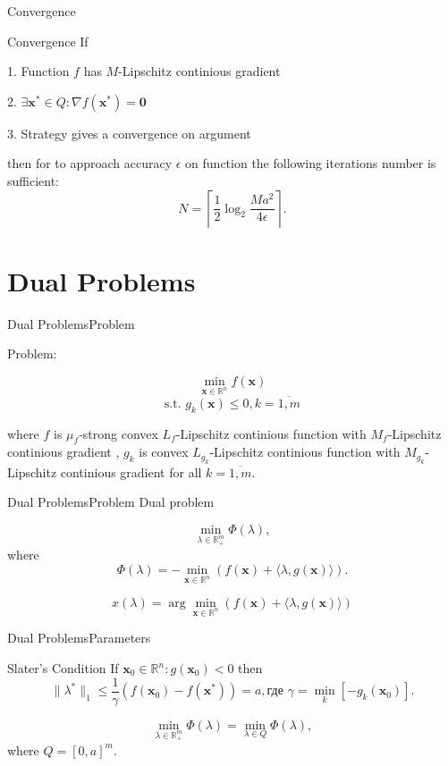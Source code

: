 \documentclass{beamer}
\begin{document}
\begin{frame}{Convergence}
\begin{block}{Convergence}
If

1. Function $f$ has $M$-Lipschitz continious gradient

2. $\exists \textbf{x}^*\in Q: \nabla f(\textbf{x}^*) = \textbf{0}$

3. Strategy gives a convergence on argument

then for to approach accuracy $\epsilon$ on function the following iterations number is sufficient:
\begin{equation}\label{NI3}N = \left\lceil\frac{1}{2}\log_2\frac{Ma^2}{4\epsilon}\right\rceil.\end{equation}
\end{block}

\end{frame}

\section{Dual Problems}
\begin{frame}{Dual Problems}{Problem}

Problem:

$$\min_{\textbf{x}\in \mathbb{R}^n} f(\textbf{x})$$
$$\text{s.t. } g_k(\textbf{x}) \leq 0, k = \overline{1,m}$$

where $f$ is $\mu_f$-strong convex $L_f$-Lipschitz continious function with $M_f$-Lipschitz continious gradient
, $g_k$  is convex $L_{g_k}$-Lipschitz continious function with $M_{g_k}$-Lipschitz continious gradient for all $k=\overline{1,m}$.
\end{frame}

\begin{frame}{Dual Problems}{Problem}
Dual problem

$$\min_{\lambda \in \mathbb{R}^m_+} \Phi(\lambda),$$
where $$\Phi(\lambda) = -\min\limits_{\textbf{x}\in \mathbb{R}^n}\left(f(\textbf{x}) + \langle\lambda, g(\textbf{x})\rangle\right).$$

$$x(\lambda) = \arg\min\limits_{\textbf{x}\in \mathbb{R}^n}\left(f(\textbf{x}) + \langle\lambda, g(\textbf{x})\rangle\right)$$
\end{frame}

\begin{frame}{Dual Problems}{Parameters}
\begin{block}{Slater's Condition}
If $\textbf{x}_0\in\mathbb{R}^n : g(\textbf{x}_0)<0$ then
$$\|\lambda^*\|_1 \leq \frac{1}{\gamma}\left(f(\textbf{x}_0)-f(\textbf{x}^*)\right)=a, \text{где } \gamma = \min_k \left[-g_k(\textbf{x}_0)\right].$$
\end{block}
\pause
$$\min_{\lambda\in\mathbb{R}^m_+}\Phi(\lambda) = \min_{\lambda\in Q}\Phi(\lambda),$$
where $Q = [0,a]^m$.
\end{frame}
\end{document}
